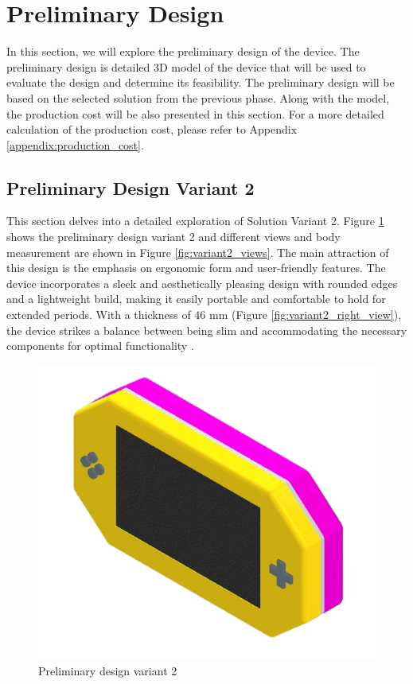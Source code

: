 

\section{Preliminary Design}
In this section, we will explore the preliminary design of the device. The preliminary design is detailed 3D model of the device that will be used to evaluate the design and determine its feasibility. The preliminary design will be based on the selected solution from the previous phase. Along with the model, the production cost will be also presented in this section. For a more detailed calculation of the production cost, please refer to Appendix \ref{appendix:production_cost}.


\subsection{Preliminary Design Variant 2}
This section delves into a detailed exploration of Solution Variant 2. Figure \ref{fig:preliminary_design_variant_2} shows the preliminary design variant 2 and different views and body measurement are shown in Figure \ref{fig:variant2_views}. The main attraction of this design is the emphasis on ergonomic form and user-friendly features. The device incorporates a sleek and aesthetically pleasing design with rounded edges and a lightweight build, making it easily portable and comfortable to hold for extended periods. With a thickness of 46 mm (Figure \ref{fig:variant2_right_view}), the device strikes a balance between being slim and accommodating the necessary components for optimal functionality .

\begin{figure}[h!]
    \centering
    \includegraphics[height=5 cm]{texs/Part1/chapter4/image/v21.png}
    \caption{Preliminary design variant 2}
    \label{fig:preliminary_design_variant_2}
\end{figure}

